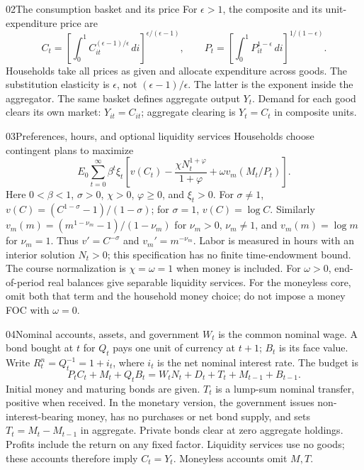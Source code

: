 \begin{modelsetup}[1]
\begin{modelcondition}{02}{The consumption basket and its price}
For $\epsilon>1$, the composite and its unit-expenditure price are
\[
 C_t=\left[\int_0^1 C_{it}^{(\epsilon-1)/\epsilon}\,di
       \right]^{\epsilon/(\epsilon-1)},\qquad
 P_t=\left[\int_0^1 P_{it}^{1-\epsilon}\,di\right]^{1/(1-\epsilon)}.
\]
Households take all prices as given and allocate expenditure across goods.
The substitution elasticity is $\epsilon$, not $(\epsilon-1)/\epsilon$.
The latter is the exponent inside the aggregator. The same basket defines
aggregate output $Y_t$. Demand for each good clears its own market:
$Y_{it}=C_{it}$; aggregate clearing is $Y_t=C_t$ in composite units.
\end{modelcondition}
\end{modelsetup}

\begin{modelsetup}[1]
\begin{modelcondition}{03}{Preferences, hours, and optional liquidity services}
Households choose contingent plans to maximize
\[
 E_0\sum_{t=0}^{\infty}\beta^t\xi_t
 \left[v(C_t)-\frac{\chi N_t^{1+\varphi}}{1+\varphi}
                 +\omega v_m(M_t/P_t)\right].
\]
Here $0<\beta<1$, $\sigma>0$, $\chi>0$, $\varphi\geq0$, and $\xi_t>0$.
For $\sigma\ne1$, $v(C)=(C^{1-\sigma}-1)/(1-\sigma)$; for $\sigma=1$,
$v(C)=\log C$. Similarly $v_m(m)=(m^{1-\nu_m}-1)/(1-\nu_m)$ for
$\nu_m>0$, $\nu_m\ne1$, and $v_m(m)=\log m$ for $\nu_m=1$.
Thus $v'=C^{-\sigma}$ and $v_m'=m^{-\nu_m}$. Labor is measured in hours
with an interior solution $N_t>0$; this specification has no finite time-endowment
bound. The course normalization is $\chi=\omega=1$ when money is included.
For $\omega>0$, end-of-period real balances give separable liquidity services.
For the moneyless core, omit both that term and the household money choice;
do not impose a money FOC with $\omega=0$.
\end{modelcondition}
\end{modelsetup}

\begin{modelsetup}[1]
\begin{modelcondition}{04}{Nominal accounts, assets, and government}
$W_t$ is the common nominal wage. A bond bought at $t$ for $Q_t$ pays one unit
of currency at $t+1$; $B_t$ is its face value. Write
$R_t^n=Q_t^{-1}=1+i_t$, where $i_t$ is the net nominal interest rate. The budget is
\[
 P_t C_t+M_t+Q_tB_t
 =W_tN_t+D_t+T_t+M_{t-1}+B_{t-1}.
\]
Initial money and maturing bonds are given. $T_t$ is a lump-sum nominal transfer,
positive when received. In the monetary version, the government issues
non-interest-bearing money, has no purchases or net bond supply, and sets
$T_t=M_t-M_{t-1}$ in aggregate. Private bonds clear at zero aggregate holdings.
Profits include the return on any fixed factor. Liquidity services use no goods;
these accounts therefore imply $C_t=Y_t$. Moneyless accounts omit $M,T$.
\end{modelcondition}
\end{modelsetup}

